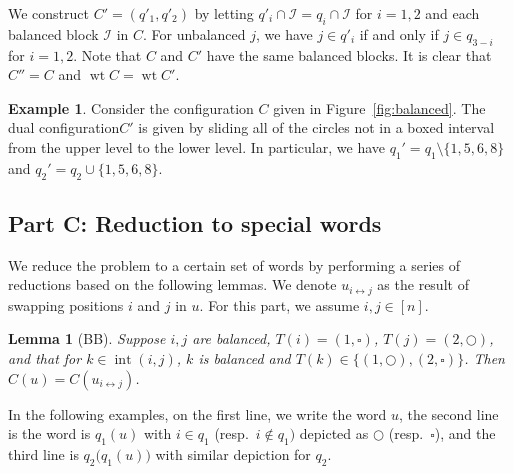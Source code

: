 \documentclass[submission]{FPSAC2018}
\newcommand{\0}{\phantom{c}}
\DeclareMathOperator{\inter}{int} %
\DeclareMathOperator{\wt}{wt} %
\newcommand{\mcI}{\mathcal{I}}
\theoremstyle{plain}
\newtheorem{lemma}[thm]{Lemma}
\theoremstyle{definition}
\newtheorem{example}[thm]{Example}
\numberwithin{equation}{section}
\begin{document}
We construct $C' = (q'_1, q'_2)$ by letting $q'_i \cap \mcI = q_i \cap \mcI$ for $i=1,2$ and each balanced block $\mcI$ in $C$.
For unbalanced $j$, we have $j \in q'_i$ if and only if $j \in q_{3-i}$ for $i = 1,2$.
Note that $C$ and $C'$ have the same balanced blocks.
It is clear that $C'' = C$ and $\wt C = \wt C'$.

\begin{example}
Consider the configuration $C$ given in Figure~\ref{fig:balanced}.
The dual configuration$C'$ is given by sliding all of the circles not in a boxed interval from the upper level to the lower level.
In particular, we have $q_1' = q_1 \setminus \{1,5,6,8\}$ and $q_2' = q_2 \cup \{1,5,6,8\}$.
\end{example}

\subsection*{Part C: Reduction to special words}

We reduce the problem to a certain set of words by performing a series of reductions based on the following lemmas.
We denote $u_{i\leftrightarrow j}$ as the result of swapping positions $i$ and $j$ in $u$.
For this part, we assume $i,j \in [n]$.


\begin{lemma}[BB]
\label{le:BB}
  Suppose $i,j$ are balanced, $T(i) = (1,\square)$, $T(j) = (2,\bigcirc)$, and that for $k \in \inter(i,j)$, $k$ is balanced and $T(k) \in \{(1,\bigcirc),(2,\square)\}$. Then $C(u) = C(u_{i \leftrightarrow j})$.
\end{lemma}

In the following examples, on the first line, we write the word $u$, the second line is the word is $q_1(u)$ with $i \in q_1$ (resp.~$i \notin q_1)$ depicted as $\bigcirc$ (resp.~$\square$), and the third line is $q_2\big(q_1(u)\bigr)$ with similar depiction for $q_2$.
\end{document}
